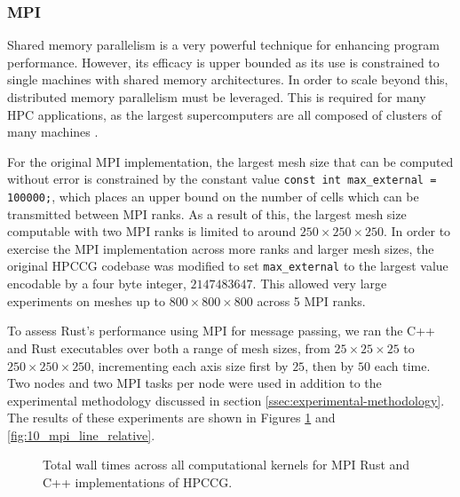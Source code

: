 \subsubsection{MPI}
\label{sssec:mpi}

Shared memory parallelism is a very powerful technique for enhancing program performance. However, its efficacy is upper bounded as its use is constrained to single machines with shared memory architectures. In order to scale beyond this, distributed memory parallelism must be leveraged. This is required for many \acrshort{HPC} applications, as the largest supercomputers are all composed of clusters of many machines \cite{HomeTOP500}.

For the original MPI implementation, the largest mesh size that can be computed without error is constrained by the constant value \texttt{const int max_external = 100000;}, which places an upper bound on the number of cells which can be transmitted between MPI ranks. As a result of this, the largest mesh size computable with two MPI ranks is limited to around $250 \times 250 \times 250$. In order to exercise the MPI implementation across more ranks and larger mesh sizes, the original HPCCG codebase was modified to set \texttt{max_external} to the largest value encodable by a four byte integer, $2147483647$. This allowed very large experiments on meshes up to $800 \times 800 \times 800$ across 5 MPI ranks.

To assess Rust's performance using MPI for message passing, we ran the C++ and Rust executables over both a range of mesh sizes, from $25 \times 25 \times 25$ to $250 \times 250 \times 250$, incrementing each axis size first by $25$, then by $50$ each time. Two nodes and two MPI tasks per node were used in addition to the experimental methodology discussed in section \ref{ssec:experimental-methodology}. The results of these experiments are shown in Figures \ref{fig:9_mpi_line} and \ref{fig:10_mpi_line_relative}.


\begin{figure}[H]
    \centering
    
    \vspace*{-0.5cm}
    \caption{Total wall times across all computational kernels for MPI Rust and C++ implementations of HPCCG.}
    \label{fig:9_mpi_line}
\end{figure}

